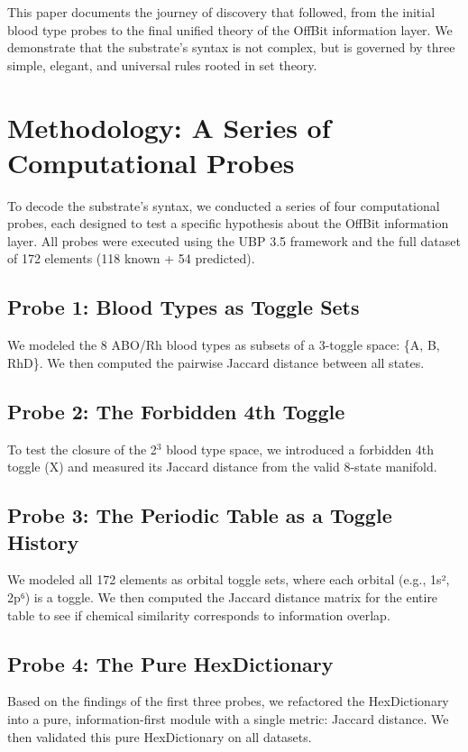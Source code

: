 \documentclass[12pt, a4paper]{article}
\begin{document}
This paper documents the journey of discovery that followed, from the initial blood type probes to the final unified theory of the OffBit information layer. We demonstrate that the substrate's syntax is not complex, but is governed by three simple, elegant, and universal rules rooted in set theory.

\section{Methodology: A Series of Computational Probes}

To decode the substrate's syntax, we conducted a series of four computational probes, each designed to test a specific hypothesis about the OffBit information layer. All probes were executed using the UBP 3.5 framework and the full dataset of 172 elements (118 known + 54 predicted).

\subsection{Probe 1: Blood Types as Toggle Sets}

We modeled the 8 ABO/Rh blood types as subsets of a 3-toggle space: \{A, B, RhD\}. We then computed the pairwise Jaccard distance between all states.

\subsection{Probe 2: The Forbidden 4th Toggle}

To test the closure of the 2$^3$ blood type space, we introduced a forbidden 4th toggle (X) and measured its Jaccard distance from the valid 8-state manifold.

\subsection{Probe 3: The Periodic Table as a Toggle History}

We modeled all 172 elements as orbital toggle sets, where each orbital (e.g., 1s², 2p⁶) is a toggle. We then computed the Jaccard distance matrix for the entire table to see if chemical similarity corresponds to information overlap.

\subsection{Probe 4: The Pure HexDictionary}

Based on the findings of the first three probes, we refactored the HexDictionary into a pure, information-first module with a single metric: Jaccard distance. We then validated this pure HexDictionary on all datasets.
\end{document}
